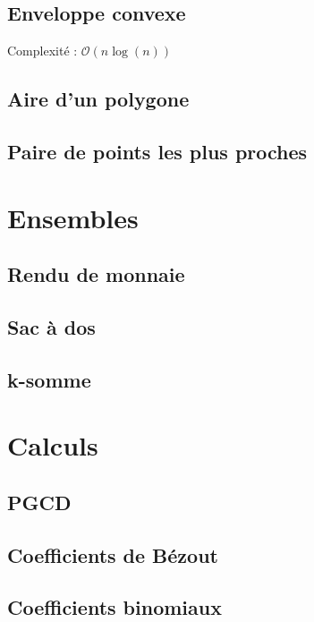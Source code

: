 \documentclass[8pt]{article}
\begin{document}
        \subsection{Enveloppe convexe}
            Complexité : $\mathcal{O}(n \log(n))$
            {\scriptsize}
        \subsection{Aire d'un polygone}
        \subsection{Paire de points les plus proches}
    \section{Ensembles}
        \subsection{Rendu de monnaie}
        \subsection{Sac à dos}
        \subsection{k-somme}
    \section{Calculs}
        \subsection{PGCD}
        {\scriptsize}
        \subsection{Coefficients de Bézout}
        {\scriptsize}
        \subsection{Coefficients binomiaux}
        {\scriptsize}
\end{document}
